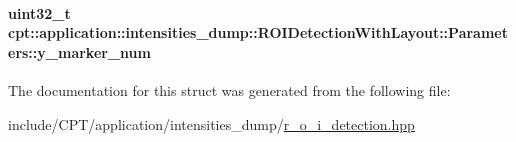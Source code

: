 \hypertarget{structcpt_1_1application_1_1intensities__dump_1_1_r_o_i_detection_with_layout_1_1_parameters_a5f4d82ff887d923f1ec4e7586cb46a6a}{
\paragraph[{y\-\_\-marker\-\_\-num}]{\setlength{\rightskip}{0pt plus 5cm}uint32\-\_\-t cpt\-::application\-::intensities\-\_\-dump\-::\-R\-O\-I\-Detection\-With\-Layout\-::\-Parameters\-::y\-\_\-marker\-\_\-num}}\label{structcpt_1_1application_1_1intensities__dump_1_1_r_o_i_detection_with_layout_1_1_parameters_a5f4d82ff887d923f1ec4e7586cb46a6a}


The documentation for this struct was generated from the following file\-:\begin{DoxyCompactItemize}
\item 
include/\-C\-P\-T/application/intensities\-\_\-dump/\hyperlink{application_2intensities__dump_2r__o__i__detection_8hpp}{r\-\_\-o\-\_\-i\-\_\-detection.\-hpp}\end{DoxyCompactItemize}
